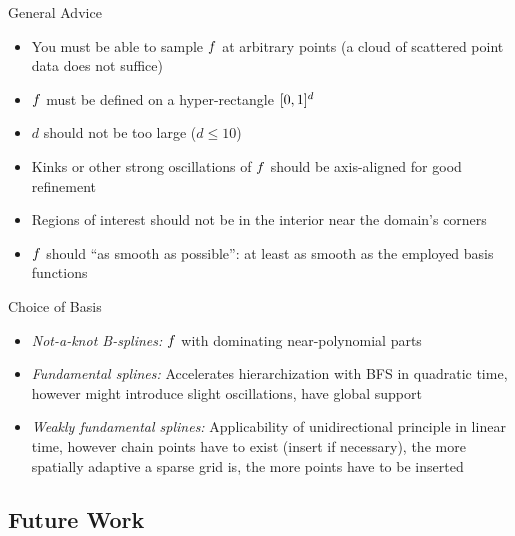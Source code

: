 \begin{frame}{\insertsubsection}{General Advice}
  \begin{itemize}
    \item
    You must be able to sample $f$ at arbitrary points
    (a cloud of scattered point data does not suffice)
    
    \item
    $f$ must be defined on a hyper-rectangle $\mathopen[0, 1\mathclose]^d$
    
    \item
    $d$ should not be too large ($d \le 10$)
    
    \item
    Kinks or other strong oscillations of $f$ should be axis-aligned
    for good refinement
    
    \item
    Regions of interest should not be in the interior near the domain's corners
    
    \item
    $f$ should ``as smooth as possible'':
    at least as smooth as the employed basis functions
  \end{itemize}
\end{frame}

\begin{frame}{\insertsubsection}{Choice of Basis}
  \begin{itemize}
    \item
    \emph{Not-a-knot B-splines:}
    $f$ with dominating near-polynomial parts
    
    \item
    \emph{Fundamental splines:}
    Accelerates hierarchization with BFS in quadratic time,
    however might introduce slight oscillations, have global support
    
    \item
    \emph{Weakly fundamental splines:}
    Applicability of unidirectional principle in linear time,
    however chain points have to exist (insert if necessary),
    the more spatially adaptive a sparse grid is,
    the more points have to be inserted
  \end{itemize}
\end{frame}



\subsection*{Future Work}

